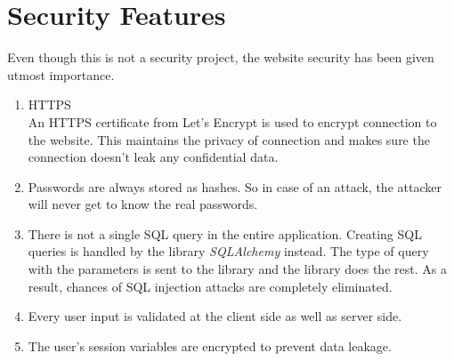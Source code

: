 \section{Security Features}
Even though this is not a security project, the website security has been given utmost importance.
\begin{enumerate}
    \item HTTPS
    \\An HTTPS certificate from Let's Encrypt is used to encrypt connection to the website. This maintains the privacy of connection and makes sure the connection doesn't leak any confidential data.
    \item Passwords are always stored as hashes. So in case of an attack, the attacker will never get to know the real passwords.
    \item There is not a single SQL query in the entire application. Creating SQL queries is handled by the library \textit{SQLAlchemy} instead. The type of query with the parameters is sent to the library and the library does the rest. As a result, chances of SQL injection attacks are completely eliminated.
    \item Every user input is validated at the client side as well as server side.
    \item The user's session variables are encrypted to prevent data leakage.
\end{enumerate}

